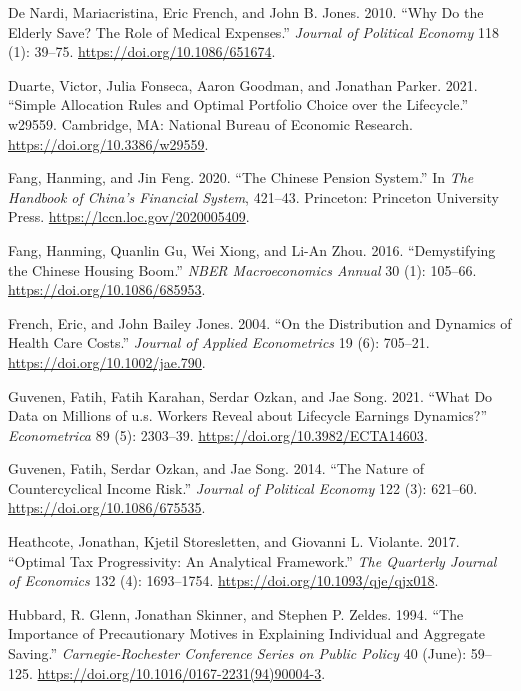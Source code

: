 \documentclass[
  12pt,
]{article}
\newlength{\cslhangindent}
\newlength{\cslentryspacingunit} %
\newenvironment{CSLReferences}[2] %
 {%
  \setlength{\parindent}{0pt}
  \ifodd #1
  \let\oldpar\par
  \def\par{\hangindent=\cslhangindent\oldpar}
  \fi
  \setlength{\parskip}{#2\cslentryspacingunit}
 }%
 {}
\begin{document}
\begin{CSLReferences}{1}{0}
\leavevmode{}%
De Nardi, Mariacristina, Eric French, and John B. Jones. 2010. {``Why Do
the Elderly Save? The Role of Medical Expenses.''} \emph{Journal of
Political Economy} 118 (1): 39--75.
\url{https://doi.org/10.1086/651674}.

\leavevmode{}%
Duarte, Victor, Julia Fonseca, Aaron Goodman, and Jonathan Parker. 2021.
{``Simple Allocation Rules and Optimal Portfolio Choice over the
Lifecycle.''} w29559. Cambridge, {MA}: National Bureau of Economic
Research. \url{https://doi.org/10.3386/w29559}.

\leavevmode{}%
Fang, Hanming, and Jin Feng. 2020. {``The Chinese Pension System.''} In
\emph{The Handbook of China's Financial System}, 421--43. Princeton:
Princeton University Press. \url{https://lccn.loc.gov/2020005409}.

\leavevmode{}%
Fang, Hanming, Quanlin Gu, Wei Xiong, and Li-An Zhou. 2016.
{``Demystifying the Chinese Housing Boom.''} \emph{{NBER} Macroeconomics
Annual} 30 (1): 105--66. \url{https://doi.org/10.1086/685953}.

\leavevmode{}%
French, Eric, and John Bailey Jones. 2004. {``On the Distribution and
Dynamics of Health Care Costs.''} \emph{Journal of Applied Econometrics}
19 (6): 705--21. \url{https://doi.org/10.1002/jae.790}.

\leavevmode{}%
Guvenen, Fatih, Fatih Karahan, Serdar Ozkan, and Jae Song. 2021. {``What
Do Data on Millions of u.s. Workers Reveal about Lifecycle Earnings
Dynamics?''} \emph{Econometrica} 89 (5): 2303--39.
\url{https://doi.org/10.3982/ECTA14603}.

\leavevmode{}%
Guvenen, Fatih, Serdar Ozkan, and Jae Song. 2014. {``The Nature of
Countercyclical Income Risk.''} \emph{Journal of Political Economy} 122
(3): 621--60. \url{https://doi.org/10.1086/675535}.

\leavevmode{}%
Heathcote, Jonathan, Kjetil Storesletten, and Giovanni L. Violante.
2017. {``Optimal Tax Progressivity: An Analytical Framework.''}
\emph{The Quarterly Journal of Economics} 132 (4): 1693--1754.
\url{https://doi.org/10.1093/qje/qjx018}.

\leavevmode{}%
Hubbard, R. Glenn, Jonathan Skinner, and Stephen P. Zeldes. 1994. {``The
Importance of Precautionary Motives in Explaining Individual and
Aggregate Saving.''} \emph{Carnegie-Rochester Conference Series on
Public Policy} 40 (June): 59--125.
\url{https://doi.org/10.1016/0167-2231(94)90004-3}.


\end{CSLReferences}
\end{document}
